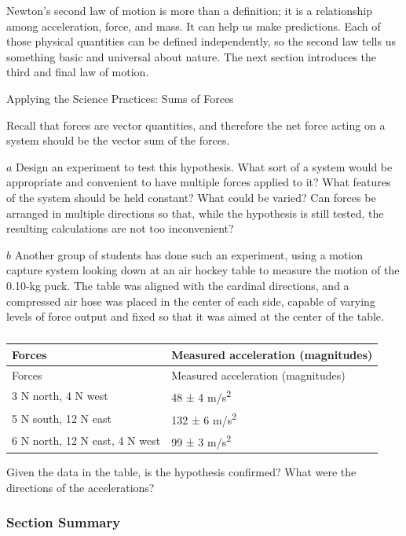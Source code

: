 \documentclass[
]{book}
\begin{document}
Newton's second law of motion is more than a definition; it is a
relationship among acceleration, force, and mass. It can help us make
predictions. Each of those physical quantities can be defined
independently, so the second law tells us something basic and universal
about nature. The next section introduces the third and final law of
motion.

\hypertarget{fs-id1660804}{}
Applying the Science Practices: Sums of Forces

Recall that forces are vector quantities, and therefore the net force
acting on a system should be the vector sum of the forces.

\(a\) Design an experiment to test this hypothesis. What sort of a
system would be appropriate and convenient to have multiple forces
applied to it? What features of the system should be held constant? What
could be varied? Can forces be arranged in multiple directions so that,
while the hypothesis is still tested, the resulting calculations are not
too inconvenient?

\(b\) Another group of students has done such an experiment, using a
motion capture system looking down at an air hockey table to measure the
motion of the 0.10-kg puck. The table was aligned with the cardinal
directions, and a compressed air hose was placed in the center of each
side, capable of varying levels of force output and fixed so that it was
aimed at the center of the table.

\begin{longtable}[]{@{}ll@{}}
\caption{{}}\tabularnewline
\toprule
Forces & Measured acceleration (magnitudes) \\
\midrule
\endfirsthead
\toprule
Forces & Measured acceleration (magnitudes) \\
\midrule
\endhead
3 N north, 4 N west & 48 ± 4 m/s\textsuperscript{2} \\
5 N south, 12 N east & 132 ± 6 m/s\textsuperscript{2} \\
6 N north, 12 N east, 4 N west & 99 ± 3 m/s\textsuperscript{2} \\
\bottomrule
\end{longtable}

Given the data in the table, is the hypothesis confirmed? What were the
directions of the accelerations?

\hypertarget{fs-id2691902-summary}{}
\hypertarget{section-summary-10}{%
\subsubsection{Section Summary}\label{section-summary-10}}
\end{document}
